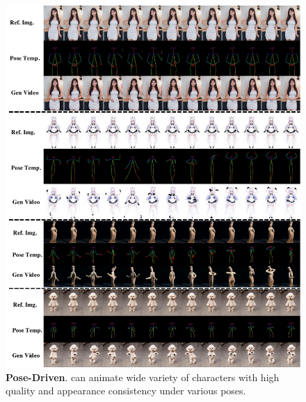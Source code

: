 \begin{figure}
    \centering
    \includegraphics[width=\linewidth]{applications/app_figures/pose.pdf}
    \caption{\textbf{Pose-Driven}. {\nameofmethod} can animate wide variety of characters with high quality and appearance consistency under various poses.}
    \label{fig:application-pose}
\end{figure}



